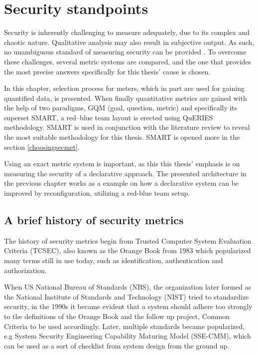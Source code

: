 \chapter{Security standpoints} \label{securitystandpoints}

Security is inherently challenging to measure adequately, due to its
complex and chaotic nature. Qualitative analysis may also result in
subjective output. As such, no unambiguous standard of measuring
security can be provided \cite{wang2005information}. To overcome these
challenges, several metric systems are compared, and the one that
provides the most precise answers specifically for this thesis' cause
is chosen.

In this chapter, selection process for meters, which in part are used
for gaining quantified data, is presented.  When finally quantitative
metrics are gained with the help of two paradigms, GQM (goal, question, metric) and
specifically its superset SMART, a red–blue team layout is erected
using QuERIES methodology. SMART is used in conjunction with the
literature review to reveal the most suitable methodology for this
thesis. SMART is opened more in the section \ref{choosingsecmet}.

Using an exact metric system is important, as this this thesis'
emphasis is on measuring the security of a declarative approach. The
presented architecture in the previous chapter works as a example on
how a declarative system can be improved by reconfiguration, utilizing
a red-blue team setup.

\section{A brief history of security metrics}

The history of security metrics begin from Trusted Computer System
Evaluation Criteria (TCSEC), also known as the Orange Book from 1983
which popularized many terms still in use today, such as
identification, authentication and
authorization. \cite{bayuk2013measuring}

When US National Bureau of Standards (NBS), the organization later
formed as the National Institute of Standards and Technology (NIST)
tried to standardize security, in the 1990s it became evident that a
system should adhere too strongly to the definitions of the Orange
Book and the follow up project, Common Criteria to be used
accordingly. Later, multiple standards became popularized, e.g System
Security Engineering Capability Maturing Model (SSE-CMM), which can be
used as a sort of checklist from system design from the ground
up. \cite{bayuk2013measuring}

